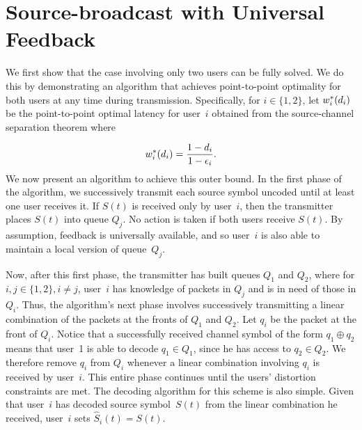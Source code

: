 \section{Source-broadcast with Universal Feedback}
\label{sec:two_users} 
We first show that the case involving only two users can be fully solved.  We do this by demonstrating an algorithm that achieves point-to-point optimality for both users at any time during transmission.  Specifically, for $i \in \{1, 2\}$, let $w_{i}^{*}(d_i)$ be the point-to-point optimal latency for user~$i$ obtained from the source-channel separation theorem where

\begin{align}
\label{eq:wid_optimal}
	w_{i}^{*}(d_i) = \frac{1 - d_i}{1 - \epsilon_i}.
\end{align}
We now present an algorithm to achieve this outer bound.  In the first phase of the algorithm, we successively transmit each source symbol uncoded until at least one user receives it. If $S(t)$ is received only by user~$i$,  then the transmitter places $S(t)$ into queue $Q_j$.
No action is taken if both users receive $S(t)$. By assumption, feedback is universally available, and so user~$i$ is also able to maintain a local version of queue~$Q_j$.

Now, after this first phase, the transmitter has built queues $Q_1$ and $Q_2$, where 
for $i,j \in \{1, 2\}, i\neq j$, 
user~$i$ has knowledge of packets in $Q_j$ and is in need of those in $Q_i$.
Thus, the algorithm's next phase involves successively transmitting a linear combination of the packets at the fronts of $Q_1$ and $Q_2$.  Let $q_i$ be the packet at the front of $Q_i$.  Notice that a successfully received channel symbol of the form $q_1 \oplus q_2$ means that user~1 is able to decode $q_1 \in Q_1$,  since he has access to $q_2 \in Q_2$. 
We therefore remove $q_i$ from $Q_i$ whenever a linear combination involving $q_i$ is received by user~$i$.
%
This entire phase continues until the users' distortion constraints are met.  The decoding algorithm for this scheme is also simple.  Given that user~$i$ has decoded source symbol~$S(t)$ from the linear combination he received, user~$i$ sets $\hat{S}_i(t) = S(t)$.

